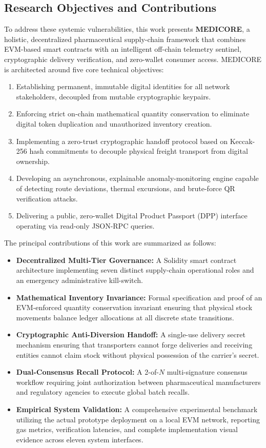 \documentclass[pdflatex,sn-mathphys-num]{sn-jnl}
\theoremstyle{thmstyleone}
\theoremstyle{thmstyletwo}
\theoremstyle{thmstylethree}
\begin{document}
\subsection{Research Objectives and Contributions}

To address these systemic vulnerabilities, this work presents \textbf{MEDICORE}, a holistic, decentralized pharmaceutical supply-chain framework that combines EVM-based smart contracts with an intelligent off-chain telemetry sentinel, cryptographic delivery verification, and zero-wallet consumer access. MEDICORE is architected around five core technical objectives:
\begin{enumerate}
    \item Establishing permanent, immutable digital identities for all network stakeholders, decoupled from mutable cryptographic keypairs.
    \item Enforcing strict on-chain mathematical quantity conservation to eliminate digital token duplication and unauthorized inventory creation.
    \item Implementing a zero-trust cryptographic handoff protocol based on Keccak-256 hash commitments to decouple physical freight transport from digital ownership.
    \item Developing an asynchronous, explainable anomaly-monitoring engine capable of detecting route deviations, thermal excursions, and brute-force QR verification attacks.
    \item Delivering a public, zero-wallet Digital Product Passport (DPP) interface operating via read-only JSON-RPC queries.
\end{enumerate}

The principal contributions of this work are summarized as follows:
\begin{itemize}
    \item \textbf{Decentralized Multi-Tier Governance:} A Solidity smart contract architecture implementing seven distinct supply-chain operational roles and an emergency administrative kill-switch.
    \item \textbf{Mathematical Inventory Invariance:} Formal specification and proof of an EVM-enforced quantity conservation invariant ensuring that physical stock movements balance ledger allocations at all discrete state transitions.
    \item \textbf{Cryptographic Anti-Diversion Handoff:} A single-use delivery secret mechanism ensuring that transporters cannot forge deliveries and receiving entities cannot claim stock without physical possession of the carrier's secret.
    \item \textbf{Dual-Consensus Recall Protocol:} A 2-of-$N$ multi-signature consensus workflow requiring joint authorization between pharmaceutical manufacturers and regulatory agencies to execute global batch recalls.
    \item \textbf{Empirical System Validation:} A comprehensive experimental benchmark utilizing the actual prototype deployment on a local EVM network, reporting gas metrics, verification latencies, and complete implementation visual evidence across eleven system interfaces.
\end{itemize}
\end{document}
